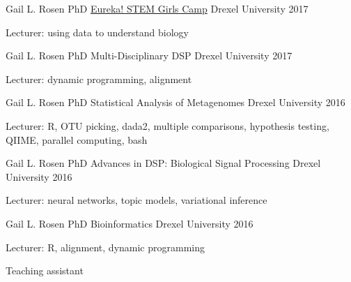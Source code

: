 



\begin{cventries}

\cventry
    {Gail L. Rosen PhD}
    {\href{https://drexel.edu/engineering/academics/high-school-programs/eureka/}{Eureka! STEM Girls Camp}}
    {Drexel University}
    {2017}
    {\begin{cvitems}
        \item Lecturer: using data to understand biology
    \end{cvitems}}
    
\cventry
    {Gail L. Rosen PhD}
    {Multi-Disciplinary DSP}
    {Drexel University}
    {2017}
    {\begin{cvitems}
        \item Lecturer: dynamic programming, alignment
    \end{cvitems}}
    
\cventry
    {Gail L. Rosen PhD}
    {Statistical Analysis of Metagenomes}
    {Drexel University}
    {2016}
    {\begin{cvitems}
        \item Lecturer: R, OTU picking, dada2, multiple comparisons, hypothesis testing, QIIME, parallel computing, bash
    \end{cvitems}}
\cventry
    {Gail L. Rosen PhD}
    {Advances in DSP: Biological Signal Processing}
    {Drexel University}
    {2016}
    {\begin{cvitems}
        \item Lecturer: neural networks, topic models, variational inference
    \end{cvitems}}
    
\cventry
    {Gail L. Rosen PhD}
    {Bioinformatics}
    {Drexel University}
    {2016}
    {\begin{cvitems}
        \item Lecturer: R, alignment, dynamic programming
        \item Teaching assistant
    \end{cvitems}}
    

\end{cventries}
